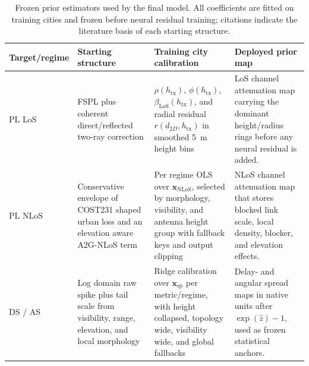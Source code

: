 \documentclass[journal]{IEEEtran}
\begin{document}
\begin{table}[!t]
\centering
\caption{Frozen prior estimators used by the final model. All coefficients are
fitted on training cities and frozen before neural residual training; citations
indicate the literature basis of each starting structure.}
\label{tab:prior-branches}
\scriptsize
\setlength{\tabcolsep}{3pt}
\begin{tabularx}{\textwidth}{p{}p{}p{}X}
\toprule
Target/regime & Starting structure & Training city calibration & Deployed prior map \\
\midrule
PL LoS &
FSPL plus coherent direct/reflected two-ray correction
\cite{rappaport,goldsmith,wocc2021} &
\(\rho(h_{\mathrm{tx}})\), \(\phi(h_{\mathrm{tx}})\), \(\beta_{\mathrm{LoS}}(h_{\mathrm{tx}})\),
and radial residual \(r(d_{2D},h_{\mathrm{tx}})\) in smoothed
\SI{5}{m} height bins &
LoS channel attenuation map carrying the dominant height/radius rings before any neural
residual is added. \\
PL NLoS &
Conservative envelope of COST231 shaped urban loss and an elevation aware
A2G-NLoS term \cite{cost231,alhourani2014,khawaja_survey,tr38901} &
Per regime OLS over \(\mathbf{x}_{\mathrm{NLoS}}\), selected by morphology,
visibility, and antenna height group with fallback keys and output clipping &
NLoS channel attenuation map that stores blocked link scale, local density, blocker, and
elevation effects. \\
DS / AS &
Log domain raw spike plus tail scale from visibility, range, elevation, and
local morphology \cite{tr38901,winner2,cai2019,izydorczyk2019} &
Ridge calibration over \(\mathbf{x}_{\mathrm{sp}}\) per metric/regime, with
height collapsed, topology wide, visibility wide, and global fallbacks &
Delay- and angular spread maps in native units after \(\exp(\hat z)-1\),
used as frozen statistical anchors. \\
\bottomrule
\end{tabularx}
\end{table}
\end{document}
